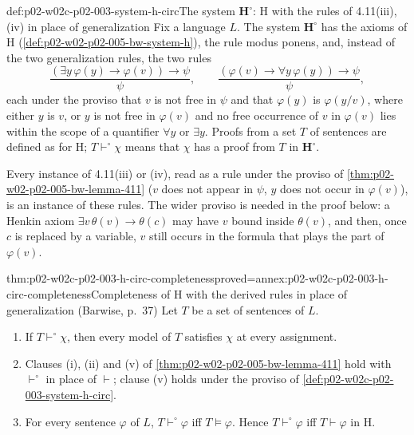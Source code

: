 \begin{hbdefinition}{def:p02-w02c-p02-003-system-h-circ}{The system \(\mathbf H^{\circ}\): H with the rules of 4.11(iii), (iv) in place of generalization}
Fix a language \(L\).  The system \(\mathbf H^{\circ}\) has the axioms of H
(\cref{def:p02-w02-p02-005-bw-system-h}), the rule modus ponens, and,
instead of the two generalization rules, the two rules
\[
\frac{(\exists y\,\varphi(y)\to\varphi(v))\to\psi}{\psi},\qquad
\frac{(\varphi(v)\to\forall y\,\varphi(y))\to\psi}{\psi},
\]
each under the proviso that \(v\) is not free in \(\psi\) and that
\(\varphi(y)\) is \(\varphi(y/v)\), where either \(y\) is \(v\), or \(y\) is
not free in \(\varphi(v)\) and no free occurrence of \(v\) in
\(\varphi(v)\) lies within the scope of a quantifier \(\forall y\) or
\(\exists y\).  Proofs from a set \(T\) of sentences are defined as for H;
\(T\vdash^{\circ}\chi\) means that \(\chi\) has a proof from \(T\) in
\(\mathbf H^{\circ}\).
\end{hbdefinition}

Every instance of 4.11(iii) or (iv), read as a rule under the proviso of
\cref{thm:p02-w02-p02-005-bw-lemma-411} (\(v\) does not appear in \(\psi\),
\(y\) does not occur in \(\varphi(v)\)), is an instance of these rules.
The wider proviso is needed in the proof below: a Henkin axiom
\(\exists v\,\theta(v)\to\theta(c)\) may have \(v\) bound inside
\(\theta(v)\), and then, once \(c\) is replaced by a variable, \(v\) still
occurs in the formula that plays the part of \(\varphi(v)\).

\begin{hbtheorem}{thm:p02-w02c-p02-003-h-circ-completeness}{proved=annex:p02-w02c-p02-003-h-circ-completeness}{Completeness of H with the derived rules in place of generalization (Barwise, p.~37)}
Let \(T\) be a set of sentences of \(L\).
\begin{enumerate}
\item If \(T\vdash^{\circ}\chi\), then every model of \(T\) satisfies
      \(\chi\) at every assignment.
\item Clauses (i), (ii) and (v) of
      \cref{thm:p02-w02-p02-005-bw-lemma-411} hold with
      \(\vdash^{\circ}\) in place of \(\vdash\); clause (v) holds under the
      proviso of \cref{def:p02-w02c-p02-003-system-h-circ}.
\item For every sentence \(\varphi\) of \(L\), \(T\vdash^{\circ}\varphi\)
      iff \(T\models\varphi\).  Hence \(T\vdash^{\circ}\varphi\) iff
      \(T\vdash\varphi\) in H.
\end{enumerate}
\end{hbtheorem}

